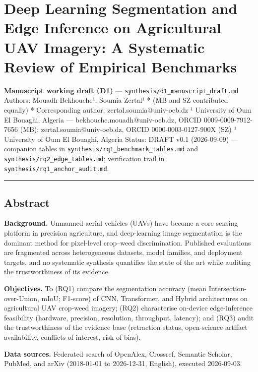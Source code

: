 \documentclass[11pt]{article}
\begin{document}
\section{Deep Learning Segmentation and Edge Inference on Agricultural
UAV Imagery: A Systematic Review of Empirical
Benchmarks}\label{deep-learning-segmentation-and-edge-inference-on-agricultural-uav-imagery-a-systematic-review-of-empirical-benchmarks}

\textbf{Manuscript working draft (D1)} ---
\texttt{synthesis/d1\_manuscript\_draft.md} Authors: Mouadh Bekhouche¹,
Soumia Zertal¹ * (MB and SZ contributed equally) * Corresponding author:
zertal.soumia@univ-oeb.dz ¹ University of Oum El Bouaghi, Algeria ---
bekhouche.mouadh@univ-oeb.dz, ORCID 0009-0009-7912-7656 (MB);
zertal.soumia@univ-oeb.dz, ORCID 0000-0003-0127-900X (SZ) ¹ University
of Oum El Bouaghi, Algeria Status: DRAFT v0.1 (2026-09-09) --- companion
tables in \texttt{synthesis/rq1\_benchmark\_tables.md} and
\texttt{synthesis/rq2\_edge\_tables.md}; verification trail in
\texttt{synthesis/rq1\_anchor\_audit.md}.

\begin{center}\rule{0.5\linewidth}{0.5pt}\end{center}

\subsection{Abstract}\label{abstract}

\textbf{Background.} Unmanned aerial vehicles (UAVs) have become a core
sensing platform in precision agriculture, and deep-learning image
segmentation is the dominant method for pixel-level crop--weed
discrimination. Published evaluations are fragmented across
heterogeneous datasets, model families, and deployment targets, and no
systematic synthesis quantifies the state of the art while auditing the
trustworthiness of its evidence.

\textbf{Objectives.} To (RQ1) compare the segmentation accuracy (mean
Intersection-over-Union, mIoU; F1-score) of CNN, Transformer, and Hybrid
architectures on agricultural UAV crop-weed imagery; (RQ2) characterise
on-device edge-inference feasibility (hardware, precision, resolution,
throughput, latency); and (RQ3) audit the trustworthiness of the
evidence base (retraction status, open-science artifact availability,
conflicts of interest, risk of bias).

\textbf{Data sources.} Federated search of OpenAlex, Crossref, Semantic
Scholar, PubMed, and arXiv (2018-01-01 to 2026-12-31, English), executed
2026-09-03.
\end{document}
